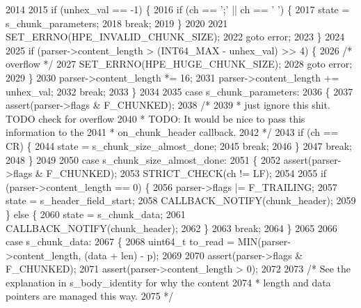 \begin{DoxyCode}
2014 
2015         \textcolor{keywordflow}{if} (unhex\_val == -1) \{
2016           \textcolor{keywordflow}{if} (ch == \textcolor{charliteral}{';'} || ch == \textcolor{charliteral}{' '}) \{
2017             state = s_chunk_parameters;
2018             \textcolor{keywordflow}{break};
2019           \}
2020 
2021           SET_ERRNO(HPE_INVALID_CHUNK_SIZE);
2022           \textcolor{keywordflow}{goto} error;
2023         \}
2024 
2025         \textcolor{keywordflow}{if} (parser->content_length > (INT64\_MAX - unhex\_val) >> 4) \{
2026           \textcolor{comment}{/* overflow */}
2027           SET_ERRNO(HPE_HUGE_CHUNK_SIZE);
2028           \textcolor{keywordflow}{goto} error;
2029         \}
2030         parser->content_length *= 16;
2031         parser->content_length += unhex\_val;
2032         \textcolor{keywordflow}{break};
2033       \}
2034 
2035       \textcolor{keywordflow}{case} s_chunk_parameters:
2036       \{
2037         assert(parser->flags & F_CHUNKED);
2038         \textcolor{comment}{/*}
2039 \textcolor{comment}{         * just ignore this shit. TODO check for overflow}
2040 \textcolor{comment}{         * TODO: It would be nice to pass this information to the}
2041 \textcolor{comment}{         * on\_chunk\_header callback.}
2042 \textcolor{comment}{         */}
2043         \textcolor{keywordflow}{if} (ch == CR) \{
2044           state = s_chunk_size_almost_done;
2045           \textcolor{keywordflow}{break};
2046         \}
2047         \textcolor{keywordflow}{break};
2048       \}
2049 
2050       \textcolor{keywordflow}{case} s_chunk_size_almost_done:
2051       \{
2052         assert(parser->flags & F_CHUNKED);
2053         STRICT_CHECK(ch != LF);
2054 
2055         \textcolor{keywordflow}{if} (parser->content_length == 0) \{
2056           parser->flags |= F_TRAILING;
2057           state = s_header_field_start;
2058           CALLBACK_NOTIFY(chunk\_header);
2059         \} \textcolor{keywordflow}{else} \{
2060           state = s_chunk_data;
2061           CALLBACK_NOTIFY(chunk\_header);
2062         \}
2063         \textcolor{keywordflow}{break};
2064       \}
2065 
2066       \textcolor{keywordflow}{case} s_chunk_data:
2067       \{
2068         uint64\_t to\_read = MIN(parser->content_length, (data + len) - p);
2069 
2070         assert(parser->flags & F_CHUNKED);
2071         assert(parser->content_length > 0);
2072 
2073         \textcolor{comment}{/* See the explanation in s\_body\_identity for why the content}
2074 \textcolor{comment}{         * length and data pointers are managed this way.}
2075 \textcolor{comment}{         */}

\end{DoxyCode}
